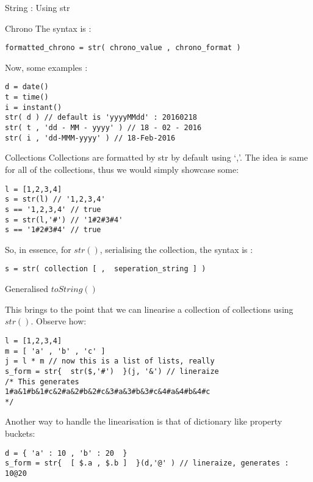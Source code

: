 \begin{section}{String : Using str}
\begin{subsection}{Chrono}
The syntax is :

\begin{lstlisting}[style=JexlStyle]
formatted_chrono = str( chrono_value , chrono_format )
\end{lstlisting}

Now, some examples :

\begin{lstlisting}[style=JexlStyle]
d = date()
t = time()
i = instant()
str( d ) // default is 'yyyyMMdd' : 20160218
str( t , 'dd - MM - yyyy' ) // 18 - 02 - 2016
str( i , 'dd-MMM-yyyy' ) // 18-Feb-2016 
\end{lstlisting}

\end{subsection}

\begin{subsection}{Collections}
Collections are formatted by str by default using `,'.
The idea is same for all of the collections, thus we would simply showcase some:

\begin{lstlisting}[style=JexlStyle]
l = [1,2,3,4]
s = str(l) // '1,2,3,4'
s == '1,2,3,4' // true 
s = str(l,'#') // '1#2#3#4'
s == '1#2#3#4' // true 
\end{lstlisting}

So, in essence, for $str()$, serialising the collection, the syntax is :

\begin{lstlisting}[style=JexlStyle]
s = str( collection [ ,  seperation_string ] )
\end{lstlisting}

\end{subsection}

\begin{subsection}{Generalised $toString()$ }

This brings to the point that we can linearise a collection of collections using $str()$.
Observe how:

\begin{lstlisting}[style=JexlStyle]
l = [1,2,3,4]
m = [ 'a' , 'b' , 'c' ] 
j = l * m // now this is a list of lists, really 
s_form = str{  str($,'#')  }(j, '&') // lineraize 
/* This generates 
1#a&1#b&1#c&2#a&2#b&2#c&3#a&3#b&3#c&4#a&4#b&4#c
*/
\end{lstlisting}

Another way to handle the linearisation is that of dictionary like property buckets:

\begin{lstlisting}[style=JexlStyle]
d = { 'a' : 10 , 'b' : 20  } 
s_form = str{  [ $.a , $.b ]  }(d,'@' ) // lineraize, generates : 10@20
\end{lstlisting}
\end{subsection}
\end{section}

